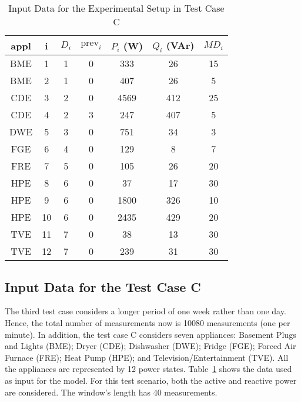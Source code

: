 \begin{table}[t]
\centering
\caption{Input Data for the Experimental Setup in Test Case C}
\label{statesCB}
\begin{tabular}{ccccccc}
\hline
\textbf{appl} & \textbf{i} & \textbf{$D_i$} & \textbf{$\text{prev}_i$} & \textbf{$P_i$} (W) & \textbf{$Q_i$ (VAr)} & \textbf{$MD_i$} \\
\hline    
    BME      &  1          &  1      &  0         &  333           &  26        &  15            \\
    BME      &  2          &  1      &  0         &  407           &  26        &  5             \\
    CDE      &  3          &  2      &  0         &  4569 	       &  412       &  25            \\
	CDE	     &  4		   &  2	     &  3		  &  247	       &  407       &  5             \\
    DWE      &  5          &  3      &  0         &  751 	       &  34        &  3             \\
    FGE      &  6          &  4      &  0         &  129 	       &  8         &  7             \\
	FRE      &  7          &  5      &  0         &  105		   &  26	    &  20            \\
	HPE      &  8 	       &  6	     &  0		  &  37	           &  17        &  30            \\
	HPE      &  9 	       &  6	     &  0		  &  1800	       &  326       &  10            \\
	HPE      &  10		   &  6      &  0         &  2435	       &  429       &  20            \\
	TVE      &  11		   &  7	     &  0		  &  38	           &  13        &  30            \\
	TVE      &  12		   &  7	     &  0		  &  239	       &  31        &  30	         \\
\hline
\end{tabular}
\end{table}

\subsection{Input Data for the Test Case C}
The third test case considers a longer period of one week rather than one day. Hence, the total number of measurements now is 10080 measurements (one per minute). In addition, the test case C considers seven appliances: Basement Plugs and Lights (BME); Dryer (CDE); Dishwasher (DWE); Fridge (FGE); Forced Air Furnace (FRE); Heat Pump (HPE); and Television/Entertainment (TVE). All the appliances are represented by 12 power states. Table~\ref{statesCB} shows the data used as input for the model. For this test scenario, both the active and reactive power are considered. The window's length has 40 measurements.

